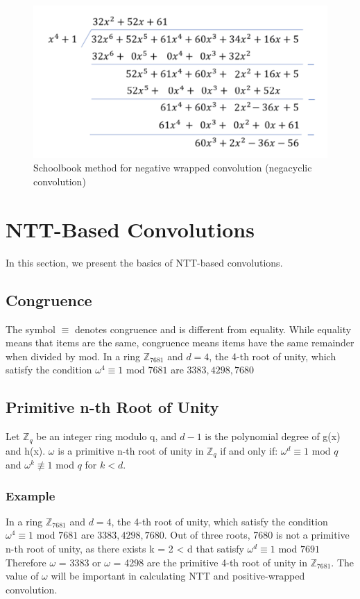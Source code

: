 \documentclass{techrep}
\theoremstyle{definition}
\theoremstyle{plain}
\newcommand{\Z}{\mathbb{Z}}
\begin{document}
	\begin{figure}[H]
		\centering
		\includegraphics[width=.7\columnwidth]{fig/NWC_1.png}
		\caption{Schoolbook method for negative wrapped convolution (negacyclic convolution)}
		\label{fig:NWC_1}
	\end{figure}


	\section{NTT-Based Convolutions}
	In this section, we present the basics of NTT-based convolutions.

	\subsection{Congruence}
	The symbol $\equiv$ denotes congruence and is different from equality. While equality means that items are the same, congruence means items have the same remainder when divided by mod. In a ring $\Z_{7681}$  and $d = 4$, the 4-th root of unity, which satisfy the condition $\omega^4 \equiv 1$ mod $7681$ are ${3383, 4298, 7680}$

	\subsection{Primitive n-th Root of Unity}
	Let $\Z_{q}$  be an integer ring modulo q, and $d - 1$ is the polynomial degree of g(x) and h(x). $\omega$ is a primitive n-th root of unity in $\Z_{q}$ if and only if:
	$\omega^d \equiv 1$ mod $q$ and $\omega^k \nequiv 1$ mod $q$  for $k < d$.

	\subsubsection{Example}
	In a ring $\Z_{7681}$  and $d = 4$, the 4-th root of unity, which satisfy the condition $\omega^4 \equiv 1$ mod $7681$ are ${3383, 4298, 7680}$. Out of three roots, 7680 is not a primitive n-th root of unity, as there exists k = 2 < d that satisfy $\omega^d \equiv 1$ mod $7691$ Therefore $\omega$ = 3383 or $\omega$ = 4298 are the primitive 4-th root of unity in $\Z_{7681}$. The value of $\omega$  will be important in calculating NTT and positive-wrapped convolution.
\end{document}

